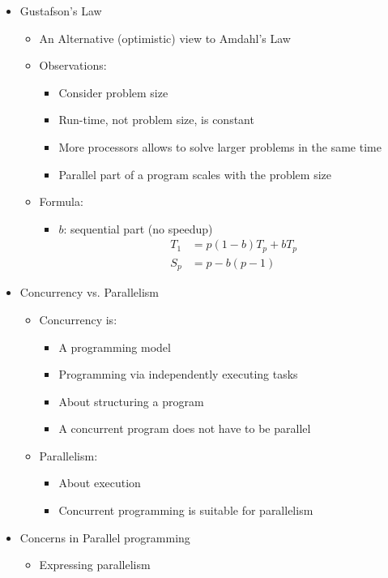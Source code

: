 \documentclass[a4paper]{article}
\begin{document}
\begin{itemize}
\begin{itemize}
\begin{itemize}
\end{itemize}
\end{itemize}
\item Gustafson's Law
\begin{itemize}
\item An Alternative (optimistic) view to Amdahl's Law
\item Observations:
\begin{itemize}
\item Consider problem size
\item Run-time, not problem size, is constant
\item More processors allows to solve larger problems in the same time
\item Parallel part of a program scales with the problem size
\end{itemize}
\item Formula:
\begin{itemize}
\item $b$: sequential part (no speedup)
\begin{align*}
T_1&=p(1-b)T_p+bT_p\\
S_p&=p-b(p-1)
\end{align*}
\end{itemize}
\end{itemize}
\item Concurrency vs. Parallelism
\begin{itemize}
\item Concurrency is:
\begin{itemize}
\item A programming model
\item Programming via independently executing tasks
\item About structuring a program 
\item A concurrent program does not have to be parallel
\end{itemize}
\item Parallelism:
\begin{itemize}
\item About execution
\item Concurrent programming is suitable for parallelism
\end{itemize}
\end{itemize}
\item Concerns in Parallel programming
\begin{itemize}
\item Expressing parallelism

\end{itemize}
\end{itemize}
\end{document}
